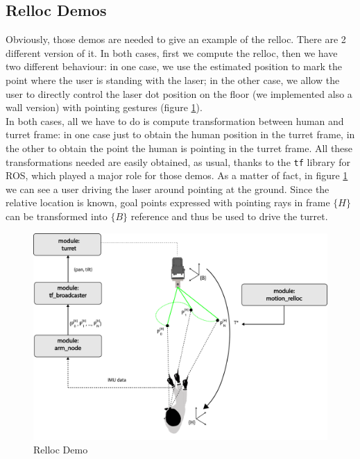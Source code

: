 \subsection{Relloc Demos}
Obviously, those demos are needed to give an example of the \ac{relloc}. There are 2 different version of it. In both cases, first we compute the \ac{relloc}, then we have two different behaviour: in one case, we use the estimated position to mark the point where the user is standing with the laser; in the other case, we allow the user to directly control the laser dot position on the floor (we implemented also a wall version) with pointing gestures (figure \ref{fig:rellocDemo}).\\
In both cases, all we have to do is compute transformation between human and turret frame: in one case just to obtain the human position in the turret frame, in the other to obtain the point the human is pointing in the turret frame. All these transformations needed are easily obtained, as usual, thanks to the \texttt{tf} library for \ac{ROS}, which played a major role for those demos. As a matter of fact, in figure \ref{fig:rellocDemo} we can see a user driving the laser around pointing at the ground. Since the relative location is known, goal points expressed with pointing rays in frame $\{H\}$ can be transformed into $\{B\}$ reference and thus be used to drive the turret.
\begin{figure}
	\centering
	\includegraphics[width=\textwidth]{img/rellocDemo2.png}%
	\caption{Relloc Demo}
	\label{fig:rellocDemo}
\end{figure}
